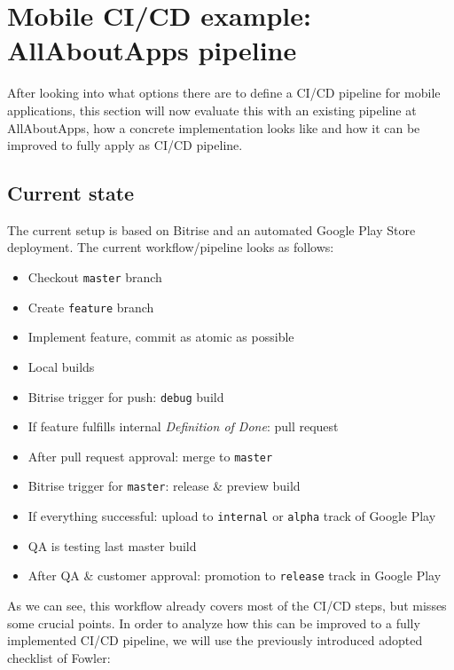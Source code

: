 \section{Mobile CI/CD example: AllAboutApps pipeline}
After looking into what options there are to define a CI/CD pipeline for mobile applications, this section will now evaluate this with an existing pipeline at AllAboutApps, how a concrete implementation looks like and how it can be improved to fully apply as CI/CD pipeline.

\subsection{Current state}
The current setup is based on Bitrise and an automated Google Play Store deployment. The current workflow/pipeline looks as follows:\\

\begin{itemize}
	\item Checkout \texttt{master} branch
	\item Create \texttt{feature} branch
	\item Implement feature, commit as atomic as possible
	\item Local builds
	\item Bitrise trigger for push: \texttt{debug} build
	\item If feature fulfills internal \textit{Definition of Done}: pull request
	\item After pull request approval: merge to \texttt{master}
	\item Bitrise trigger for \texttt{master}: release \& preview build
	\item If everything successful: upload to \texttt{internal} or \texttt{alpha} track of Google Play
	\item QA is testing last master build
	\item After QA \& customer approval: promotion to \texttt{release} track in Google Play\\
\end{itemize}

As we can see, this workflow already covers most of the CI/CD steps, but misses some crucial points. In order to analyze how this can be improved to a fully implemented CI/CD pipeline, we will use the previously introduced adopted checklist of Fowler:\\

